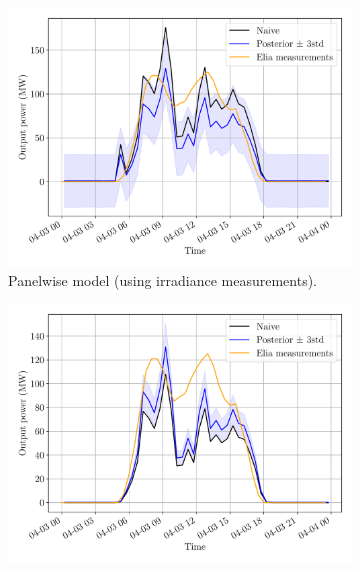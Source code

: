 \documentclass[a4paper, 12pt]{article}
\begin{document}
\begin{figure}[H]
	\centering
	\begin{subfigure}{0.48\textwidth}
		\centering
		\includegraphics[width=\textwidth]{resources/pdf/solar_panelwise_meas_meas_START_FOR_03-04-2020.pdf}
		\vspace{-0.5em}
		\caption{Panelwise model (using irradiance measurements).}
	\end{subfigure}
	\hspace{0.5em}
	\begin{subfigure}{0.48\textwidth}
		\centering
		\includegraphics[width=\textwidth]{resources/pdf/solar_provincial_meas_meas_START_FOR_03-04-2020.pdf}
		\vspace{-0.5em}

\end{subfigure}
\end{figure}
\end{document}
